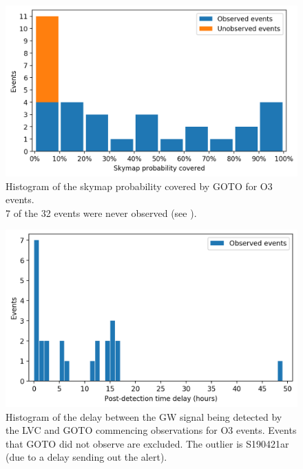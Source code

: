 \begin{colsection}
\clearpage

\makeatletter
\setlength{\@fptop}{0\p@ \@plus 1fil} %
\makeatother

\newpage

\begin{figure}[p]
    \begin{center}
        \includegraphics[width=0.95\linewidth]{images/events_prob.png}
    \end{center}
    \caption[Histogram of probabilities covered for O3 events]{
        Histogram of the skymap probability covered by GOTO for O3 events. \\
        7 of the 32 events were never observed (see ).
    }\label{fig:events_prob}
\end{figure}

\begin{figure}[p]
    \begin{center}
    \includegraphics[width=0.95\linewidth]{images/events_delay.png}
    \end{center}
    \caption[Histogram of post-event delay for O3 events]{
        Histogram of the delay between the GW signal being detected by the LVC and GOTO commencing observations for O3 events. Events that GOTO did not observe are excluded. The outlier is S190421ar (due to a delay sending out the alert).
    }\label{fig:events_delay}
\end{figure}


\end{colsection}
